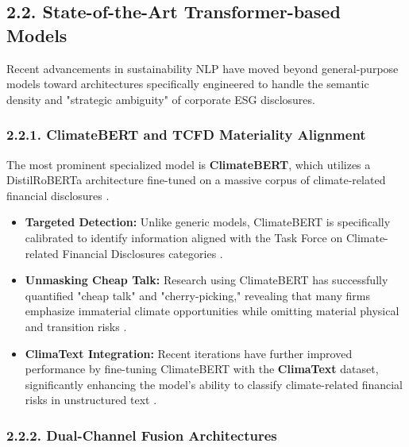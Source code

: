 \documentclass{article}
\begin{document}
\subsection*{2.2. State-of-the-Art Transformer-based Models}

Recent advancements in sustainability NLP have moved beyond general-purpose models toward architectures specifically engineered to handle the semantic density and "strategic ambiguity" of corporate ESG disclosures.
\subsubsection*{2.2.1. ClimateBERT and TCFD Materiality Alignment}

The most prominent specialized model is \textbf{ClimateBERT}, which utilizes a DistilRoBERTa architecture fine-tuned on a massive corpus of climate-related financial disclosures  \parencite{julia_bingler_268445e3}.
\begin{itemize}
\item 

\textbf{Targeted Detection:} Unlike generic models, ClimateBERT is specifically calibrated to identify information aligned with the Task Force on Climate-related Financial Disclosures categories  \parencite{julia_bingler_268445e3}.\item 

\textbf{Unmasking Cheap Talk:} Research using ClimateBERT has successfully quantified "cheap talk" and "cherry-picking," revealing that many firms emphasize immaterial climate opportunities while omitting material physical and transition risks  \parencite{julia_bingler_268445e3}.\item 

\textbf{ClimaText Integration:} Recent iterations have further improved performance by fine-tuning ClimateBERT with the \textbf{ClimaText} dataset, significantly enhancing the model's ability to classify climate-related financial risks in unstructured text  \parencite{eduardo_c__garrido_merch_n_5c6b0bfa}.
\end{itemize}
\subsubsection*{2.2.2. Dual-Channel Fusion Architectures}
\end{document}
